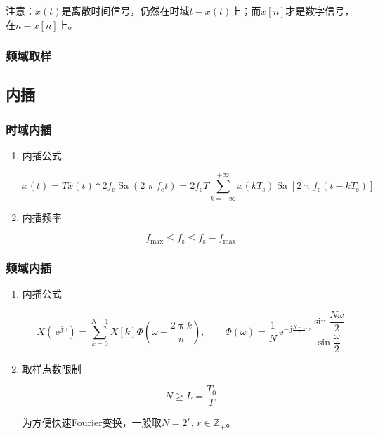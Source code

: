 \documentclass[UTF8,fontset=fandol,zihao=5]{ctexart}
\newcommand{\jj}{\,\mathrm{j}}
\newcommand{\ee}{\,\mathrm{e}}
\newcommand{\ZZ}{\mathbb{Z}}
\newcommand{\Sa}{\operatorname{Sa}}
\begin{document}
\begin{methodbox}
  注意：$\hat{x}(t)$是离散时间信号，仍然在时域$t-x(t)$上；而$x[n]$才是数字信号，在$n-x[n]$上。
\end{methodbox}

\subsubsection{频域取样}

\subsection{内插}

\subsubsection{时域内插}

\begin{enumerate}
  
  \item 内插公式
  
  \[
  x(t) = T\hat{x}(t) \ast 2f_{\mathrm{c}}\Sa(2\uppi f_{\mathrm{c}} t) = 2f_{\mathrm{c}}T\sum_{k=-\infty}^{+\infty} x(kT_{\mathrm{s}}) \Sa \left [ 2\uppi f_{\mathrm{c}}(t-kT_{\mathrm{s}}) \right ]
  \]

  \item 内插频率
  
  \[
  f_{\max} \leq f_{\mathrm{s}} \leq f_{\mathrm{s}}-f_{\max}
  \]

\end{enumerate}

\subsubsection{频域内插}

\begin{enumerate}
  
  \item 内插公式
  
  \[
  X(\ee^{\jj\omega}) = \sum_{k=0}^{N-1}X[k]\varPhi\left(\omega-\frac{2\uppi k}{n}\right),
  \qquad \varPhi(\omega)=\frac{1}{N}\ee^{-\jj\frac{N-1}{2}\omega}\frac{\sin\dfrac{N\omega}{2}}{\sin\dfrac{\omega}{2}}
  \]

  \item 取样点数限制

  \[
  N \geq L = \frac{T_0}{T}
  \]

  为方便快速Fourier变换，一般取$N=2^r, \, r \in \ZZ_+$。

\end{enumerate}
\end{document}
